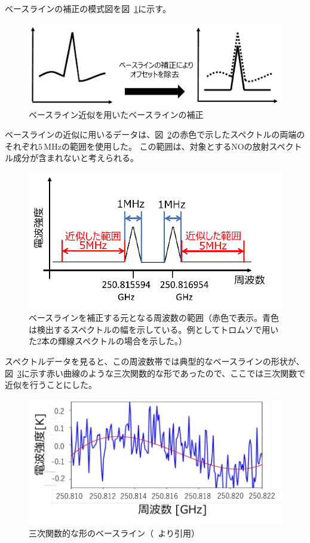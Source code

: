 ベースラインの補正の模式図を図~\ref{fig:baseline_correct_schema}に示す。
\begin{figure}[htbp]
    \centering
    \includegraphics[width=\linewidth]{master_thesis_contents/master_thesis_fig/baseline_correct_schema.pdf}
    \caption{ベースライン近似を用いたベースラインの補正}
    \label{fig:baseline_correct_schema}
\end{figure}
ベースラインの近似に用いるデータは、図~\ref{fig:baseline_range}の赤色で示したスペクトルの両端のそれぞれ$5\, \mathrm{MHz}$の範囲を使用した。
この範囲は、対象とするNOの放射スペクトル成分が含まれないと考えられる。
\begin{figure}[htbp]
    \centering
    \includegraphics[width=\linewidth]{master_thesis_contents/master_thesis_fig/baseline_range.pdf}
    \caption{ベースラインを補正する元となる周波数の範囲（赤色で表示。青色は検出するスペクトルの幅を示している。例としてトロムソで用いた2本の輝線スペクトルの場合を示した。）}
    \label{fig:baseline_range}
\end{figure}
スペクトルデータを見ると、この周波数帯では典型的なベースラインの形状が、図~\ref{fig:baseline_curve}に示す赤い曲線のような三次関数的な形であったので、ここでは三次関数で近似を行うことにした。
\begin{figure}[htbp]
    \centering
    \includegraphics[width=\linewidth]{master_thesis_contents/master_thesis_fig/baseline_curve.pdf}
    \caption{三次関数的な形のベースライン（~\cite{goto2021bachelor}より引用）}
    \label{fig:baseline_curve}
\end{figure}

